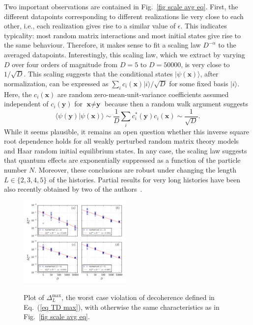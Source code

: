 \documentclass[pre,onecolumn,12pt,aps,longbibliography,nofootinbib]{revtex4-2}
\newcommand{\bb}[1]{\textbf{#1}}
\newcommand{\lr}[1]{{\langle {#1}\rangle}}
\newcommand{\new}[1]{#1}
\begin{document}
Two important observations are contained in Fig.~\ref{fig scale avg eq}. First, the different datapoints corresponding to different realizations lie very close to each other, i.e., each realization gives rise to a similar value of $\epsilon$. This indicates {typicality}: most random matrix interactions and most initial states give rise to the same behaviour. Therefore, it makes sense to fit a scaling law $D^{-\alpha}$ to the averaged datapoints. Interestingly, this scaling law, which we extract by varying $D$ over four orders of magnitude from $D=5$ to $D=50000$, is very close to $1/\sqrt{D}$. \new{This scaling suggests that the conditional states $|\psi(\bb x)\rangle$, after normalization, can be expressed as $\sum_i c_i(\bb x)|i\rangle/\sqrt{D}$ for some fixed basis $|i\rangle$. Here, the $c_i(\bb x)$ are random zero-mean-unit-variance coefficients assumed {independent} of $c_i(\bb y)$ for $\bb x\neq\bb y$ because then a random walk argument suggests
\begin{equation}
 \lr{\psi(\bb y)|\psi(\bb x)} \sim \frac{1}{D} \sum_i c_i^*(\bb y) c_i(\bb x) \sim \frac{1}{\sqrt{D}}.
\end{equation}
While it seems plausible, it remains an open question} whether this inverse square root dependence holds for all weakly perturbed random matrix theory models and Haar random initial equilibrium states. In any case, the scaling law suggests that quantum effects are exponentially suppressed as a function of the particle number $N$. Moreover, these conclusions are robust under changing the length $L\in\{2,3,4,5\}$ of the histories. \new{Partial results for very long histories have been also recently obtained by two of the authors~\cite{StrasbergSchindlerArXiv2023}.}

\begin{figure}[t]
 \centering\includegraphics[width=0.49\textwidth,clip=true]{Max_001_eq.pdf}
 \label{fig scale max eq}\vspace{-0.5cm}
 \caption{Plot of $\Delta_L^\text{max}$, the worst case violation of decoherence defined in Eq.~(\ref{eq TD max}), with otherwise the same characteristics as in Fig.~\ref{fig scale avg eq}.}
\end{figure}
\end{document}

